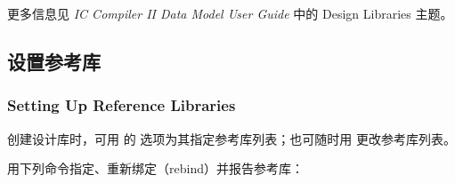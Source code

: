 \begin{seeAlsoBox}
更多信息见 \textit{IC Compiler II Data Model User Guide} 中的 Design Libraries 主题。
\end{seeAlsoBox}

\subsection{设置参考库}
\subsubsection*{Setting Up Reference Libraries}

创建设计库时，可用  的  选项为其指定参考库列表；也可随时用  更改参考库列表。

用下列命令指定、重新绑定（rebind）并报告参考库：
